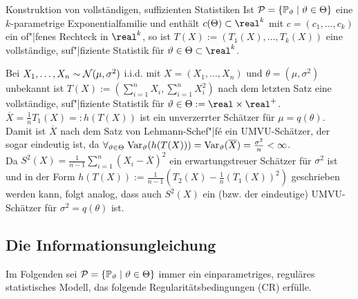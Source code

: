\begin{Satz}{Konstruktion von vollständigen, suf{}fizienten Statistiken}
    Ist $\mathcal{P} = \{\mathbb{P}_\vartheta \;|\; \vartheta \in \Theta\}$ eine $k$-parametrige Exponentialfamilie und
    enthält $c(\Theta) \subset \real^k$ mit $c = (c_1, \dotsc, c_k)$
    ein of"|fenes Rechteck in $\real^k$, so ist
    $T(X) := (T_1(X), \dotsc, T_k(X))$ eine vollständige, suf"|fiziente Statistik für
    $\theta \in \Theta \subset \real^k$.
\end{Satz}

\linie
\pagebreak

\begin{Bsp}
    Bei $X_1, \dotsc, X_n \sim \mathcal{N}(\mu, \sigma^2)$ i.i.d. mit $X = (X_1, \dotsc, X_n)$ und
    $\theta = (\mu, \sigma^2)$ unbekannt ist $T(X) := (\sum_{i=1}^n X_i, \sum_{i=1}^n X_i^2)$
    nach dem letzten Satz eine vollständige, suf"|fiziente Statistik für
    $\theta \in \Theta := \real \times \real^+$.
    $\overline{X} = \frac{1}{n} T_1(X) =: h(T(X))$ ist ein unverzerrter Schätzer für
    $\mu = q(\theta)$.
    Damit ist $\overline{X}$ nach dem Satz von Lehmann-Schef"|fé ein UMVU-Schätzer, der sogar
    eindeutig ist, da $\forall_{\vartheta \in \Theta}\; \mathrm{Var}_\vartheta(h(T(X))) =
    \mathrm{Var}_\vartheta(\overline{X}) = \frac{\sigma^2}{n} < \infty$.\\
    Da $S^2(X) = \frac{1}{n-1} \sum_{i=1}^n (X_i - \overline{X})^2$ ein erwartungstreuer Schätzer
    für $\sigma^2$ ist und in der Form
    $h(T(X)) := \frac{1}{n-1} \left(T_2(X) - \frac{1}{n} (T_1(X))^2\right)$ geschrieben werden
    kann, folgt analog, dass auch $S^2(X)$ ein (bzw. der eindeutige)
    UMVU-Schätzer für $\sigma^2 = q(\theta)$ ist.
\end{Bsp}

\subsection{%
    Die Informationsungleichung%
}

\begin{Bem}
    Im Folgenden sei $\mathcal{P} = \{\mathbb{P}_\vartheta \;|\; \vartheta \in \Theta\}$ immer ein
    einparametriges, reguläres statistisches Modell, das folgende Regularitätsbedingungen
    (CR) erfülle.
\end{Bem}

